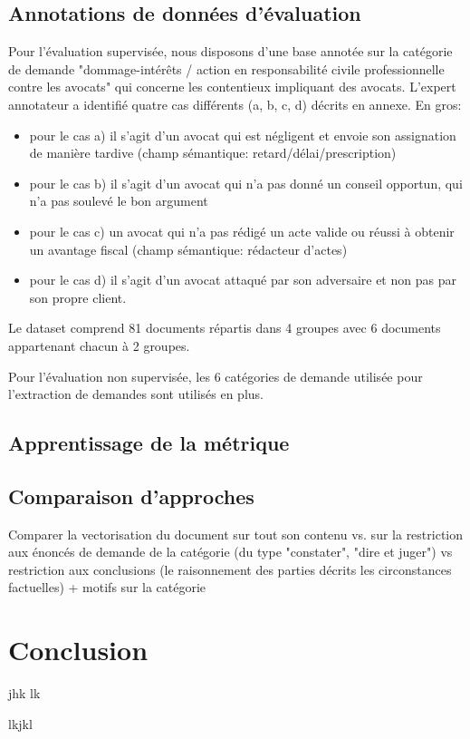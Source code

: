 \subsection{Annotations de données d'évaluation}
Pour l'évaluation supervisée, nous disposons d'une base annotée sur la catégorie de demande "dommage-intérêts / action en responsabilité civile professionnelle contre les avocats" qui concerne les contentieux impliquant des avocats.
L'expert annotateur a identifié quatre cas différents (a, b, c, d) décrits en annexe. En gros:
\begin{itemize}
\item pour le cas a) il s'agit d'un avocat qui est négligent et envoie son assignation de manière tardive (champ sémantique: retard/délai/prescription)
\item pour le cas b) il s'agit d'un avocat qui n'a pas donné un conseil opportun, qui n'a pas soulevé le bon argument
\item pour le cas c) un avocat qui n'a pas rédigé un acte valide ou réussi à obtenir un avantage fiscal (champ sémantique: rédacteur d'actes)
\item pour le cas d) il s'agit d'un avocat attaqué par son adversaire et non pas par son propre client.
\end{itemize}

Le dataset comprend 81 documents répartis dans 4 groupes avec 6 documents appartenant chacun à 2 groupes.

Pour l'évaluation non supervisée, les 6 catégories de demande utilisée pour l'extraction de demandes sont utilisés en plus.

\subsection{Apprentissage de la métrique}


\subsection{Comparaison d'approches}
Comparer la vectorisation du document sur tout son contenu vs. sur la restriction aux énoncés de demande de la catégorie (du type "constater", "dire et juger") vs restriction aux conclusions (le raisonnement des parties décrits les circonstances factuelles) + motifs sur la catégorie


\section{Conclusion}
\label{sec:similarite:conclusion}
jhk
lk

lkjkl
